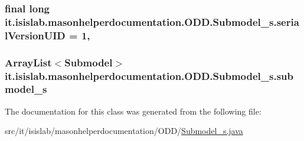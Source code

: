 \hypertarget{classit_1_1isislab_1_1masonhelperdocumentation_1_1_o_d_d_1_1_submodel__s_af0b04ffdf08b884274745f348e2bbc5f}{
\subsubsection[{serial\-Version\-U\-I\-D}]{\setlength{\rightskip}{0pt plus 5cm}final long it.\-isislab.\-masonhelperdocumentation.\-O\-D\-D.\-Submodel\-\_\-s.\-serial\-Version\-U\-I\-D = 1\hspace{0.3cm}{\ttfamily [static]}, {\ttfamily [private]}}}\label{classit_1_1isislab_1_1masonhelperdocumentation_1_1_o_d_d_1_1_submodel__s_af0b04ffdf08b884274745f348e2bbc5f}
\hypertarget{classit_1_1isislab_1_1masonhelperdocumentation_1_1_o_d_d_1_1_submodel__s_abf82b40f163d967edfba01b8050929d5}{
\subsubsection[{submodel\-\_\-s}]{\setlength{\rightskip}{0pt plus 5cm}Array\-List$<${\bf Submodel}$>$ it.\-isislab.\-masonhelperdocumentation.\-O\-D\-D.\-Submodel\-\_\-s.\-submodel\-\_\-s\hspace{0.3cm}{\ttfamily [private]}}}\label{classit_1_1isislab_1_1masonhelperdocumentation_1_1_o_d_d_1_1_submodel__s_abf82b40f163d967edfba01b8050929d5}


The documentation for this class was generated from the following file\-:\begin{DoxyCompactItemize}
\item 
src/it/isislab/masonhelperdocumentation/\-O\-D\-D/\hyperlink{_submodel__s_8java}{Submodel\-\_\-s.\-java}\end{DoxyCompactItemize}
